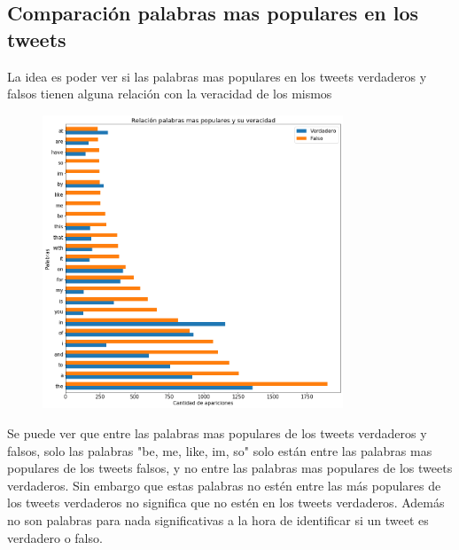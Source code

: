 \documentclass[titlepage,a4paper]{article}
\begin{document}
\subsection{\Large Comparación palabras mas populares en los tweets}
{\Large 
La idea es poder ver si las palabras mas populares en los tweets verdaderos y falsos tienen alguna relación con la veracidad de los mismos
\par}
{\Large
\begin{figure}[H]
 \centering
 \includegraphics[width=0.8\textwidth, height=0.9\textheight, keepaspectratio]{graficos/comparacionpalabrasmaspopulares.png}
\end{figure}
{\Large 
Se puede ver que entre las palabras mas populares de los tweets verdaderos y falsos, solo las palabras "be, me, like, im, so" solo están entre las palabras mas populares de los tweets falsos, y no entre las palabras mas populares de los tweets verdaderos. Sin embargo que estas palabras no estén entre las más populares de los tweets verdaderos no significa que no estén en los tweets verdaderos. Además no son palabras para nada significativas a la hora de identificar si un tweet es verdadero o falso.
\par}
\par}
\end{document}
